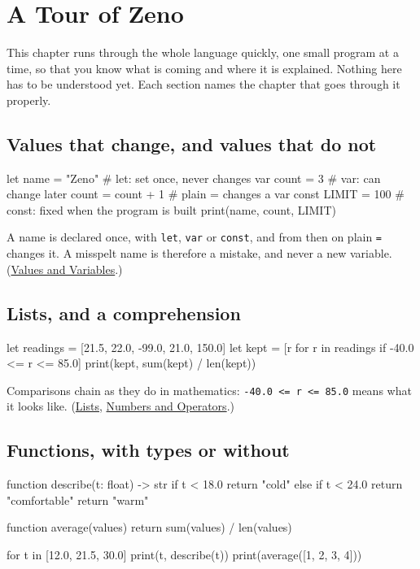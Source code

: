 \chapter{A Tour of Zeno}\label{ch-tour}

This chapter runs through the whole language quickly, one small
program at a time, so that you know what is coming and where it is
explained. Nothing here has to be understood yet. Each section names
the chapter that goes through it properly.

\section{Values that change, and values that do not}

\begin{zeno}
let name = "Zeno"         # let: set once, never changes
var count = 3             # var: can change later
count = count + 1         # plain = changes a var
const LIMIT = 100         # const: fixed when the program is built
print(name, count, LIMIT)
\end{zeno}

A name is declared once, with \verb|let|, \verb|var| or \verb|const|,
and from then on plain \verb|=| changes it. A misspelt name is
therefore a mistake, and never a new variable.
(\hyperref[ch-values]{Values and Variables}.)

\section{Lists, and a comprehension}

\begin{zeno}
let readings = [21.5, 22.0, -99.0, 21.0, 150.0]
let kept = [r for r in readings if -40.0 <= r <= 85.0]
print(kept, sum(kept) / len(kept))
\end{zeno}

Comparisons chain as they do in mathematics: \verb|-40.0 <= r <= 85.0|
means what it looks like. (\hyperref[ch-lists]{Lists},
\hyperref[ch-numbers]{Numbers and Operators}.)

\section{Functions, with types or without}

\begin{zeno}
function describe(t: float) -> str {
    if t < 18.0 {
        return "cold"
    } else if t < 24.0 {
        return "comfortable"
    }
    return "warm"
}

function average(values) {
    return sum(values) / len(values)
}

for t in [12.0, 21.5, 30.0] {
    print(t, describe(t))
}
print(average([1, 2, 3, 4]))
\end{zeno}

